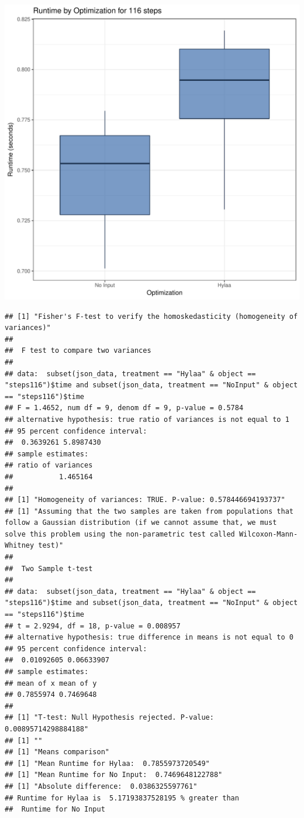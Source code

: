 \documentclass{article}\usepackage[]{graphicx}\usepackage[]{color}
\makeatletter
\def\maxwidth{ %
  \ifdim\Gin@nat@width>\linewidth
    \linewidth
  \else
    \Gin@nat@width
  \fi
}
\newenvironment{kframe}{%
 \def\at@end@of@kframe{}%
 \ifinner\ifhmode%
  \def\at@end@of@kframe{\end{minipage}}%
  \begin{minipage}{\columnwidth}%
 \fi\fi%
 \def\FrameCommand##1{\hskip\@totalleftmargin \hskip-\fboxsep
 \colorbox{shadecolor}{##1}\hskip-\fboxsep
     \hskip-\linewidth \hskip-\@totalleftmargin \hskip\columnwidth}%
 \MakeFramed {\advance\hsize-\width
   \@totalleftmargin\z@ \linewidth\hsize
   \@setminipage}}%
 {\par\unskip\endMakeFramed%
 \at@end@of@kframe}
\newenvironment{knitrout}{}{} %
\makeatother
\begin{document}
\begin{knitrout}
\color{fgcolor}
\includegraphics[width=\maxwidth]{figure/RH4_steps116-1} 
\begin{kframe}\begin{verbatim}
## [1] "Fisher's F-test to verify the homoskedasticity (homogeneity of variances)"
## 
## 	F test to compare two variances
## 
## data:  subset(json_data, treatment == "Hylaa" & object == "steps116")$time and subset(json_data, treatment == "NoInput" & object == "steps116")$time
## F = 1.4652, num df = 9, denom df = 9, p-value = 0.5784
## alternative hypothesis: true ratio of variances is not equal to 1
## 95 percent confidence interval:
##  0.3639261 5.8987430
## sample estimates:
## ratio of variances 
##           1.465164 
## 
## [1] "Homogeneity of variances: TRUE. P-value: 0.578446694193737"
## [1] "Assuming that the two samples are taken from populations that follow a Gaussian distribution (if we cannot assume that, we must solve this problem using the non-parametric test called Wilcoxon-Mann-Whitney test)"
## 
## 	Two Sample t-test
## 
## data:  subset(json_data, treatment == "Hylaa" & object == "steps116")$time and subset(json_data, treatment == "NoInput" & object == "steps116")$time
## t = 2.9294, df = 18, p-value = 0.008957
## alternative hypothesis: true difference in means is not equal to 0
## 95 percent confidence interval:
##  0.01092605 0.06633907
## sample estimates:
## mean of x mean of y 
## 0.7855974 0.7469648 
## 
## [1] "T-test: Null Hypothesis rejected. P-value: 0.00895714298884188"
## [1] ""
## [1] "Means comparison"
## [1] "Mean Runtime for Hylaa:  0.7855973720549"
## [1] "Mean Runtime for No Input:  0.7469648122788"
## [1] "Absolute difference:  0.0386325597761"
## Runtime for Hylaa is  5.17193837528195 % greater than 
##  Runtime for No Input
\end{verbatim}
\end{kframe}
\end{knitrout}
\end{document}
